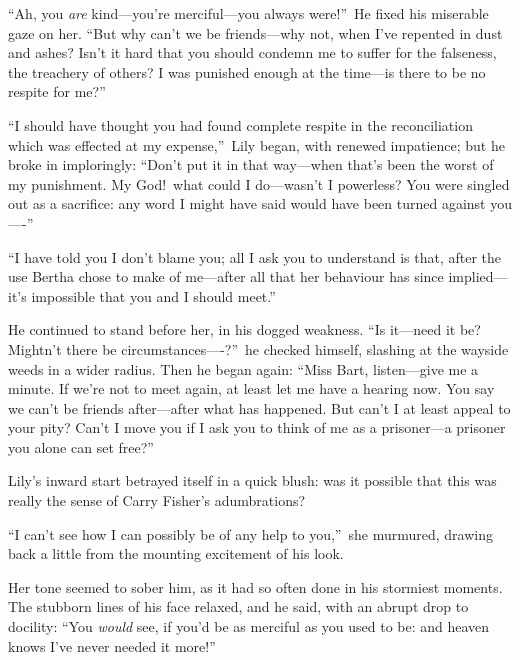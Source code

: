 \documentclass[12pt,a4paper]{book}
\begin{document}
``Ah, you \textit{are} kind---you're merciful---you always were!''\ He fixed
his miserable gaze on her. ``But why can't we be friends---why not,
when I've repented in dust and ashes? Isn't it hard that you
should condemn me to suffer for the falseness, the treachery of
others? I was punished enough at the time---is there to be no
respite for me?''





``I should have thought you had found complete respite in the
reconciliation which was effected at my expense,''\ Lily began,
with renewed impatience; but he broke in imploringly: ``Don't put
it in that way---when that's been the worst of my
punishment. My God!\ what could I do---wasn't I powerless? You were
singled out as a sacrifice: any word I might have said would have
been turned against you----''





``I have told you I don't blame you; all I ask you to understand
is that, after the use Bertha chose to make of me---after all that
her behaviour has since implied---it's impossible that you and I
should meet.''





He continued to stand before her, in his dogged weakness. ``Is
it---need it be? Mightn't there be circumstances----?''\ he checked
himself, slashing at the wayside weeds in a wider radius. Then he
began again: ``Miss Bart, listen---give me a minute. If we're not
to meet again, at least let me have a hearing now. You say we
can't be friends after---after what has happened. But can't I at
least appeal to your pity? Can't I move you if I ask you to think
of me as a prisoner---a prisoner you alone can set free?''





Lily's inward start betrayed itself in a quick blush: was it
possible that this was really the sense of Carry Fisher's
adumbrations?





``I can't see how I can possibly be of any help to you,''\ she
murmured, drawing back a little from the mounting excitement of
his look.





Her tone seemed to sober him, as it had so often done in his
stormiest moments. The stubborn lines of his face relaxed, and he
said, with an abrupt drop to docility: ``You \textit{would} see, if you'd
be as merciful as you used to be: and heaven knows I've never
needed it more!''
\end{document}
